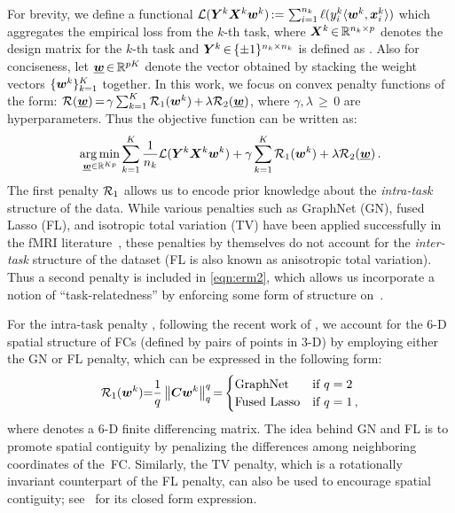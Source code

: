 For brevity, we define a functional $\mathcal{L}({\bm{Y}}^k{\bm{X}}^k{\bm{w}}^k)\,{:=}\,\sum_{i=1}^{n_k}\ell(y_i^k\langle{\ensuremath{\bm{w}}}^k,{\bm{x}}_i^k\rangle)$ which aggregates the empirical loss from the $k$-th task, where ${\bm{X}}^k\,{\in}\,\mathbb{R}^{n_k{\times}p}$ denotes the design matrix for the \mbox{$k$-th} task and ${\bm{Y}}^k\,{\in}\,\{\pm1\}^{n_k{\times}n_k}$ is defined as . 
Also for conciseness, let $\underline{{\bm{w}}}\,{\in}\,\mathbb{R}^{pK}$ denote the vector obtained by stacking the weight vectors $\{{\bm{w}}^k\}_{k=1}^K$ together.
In this work, we focus on convex penalty functions of the form:
$\mathcal{R}(\underline{{\bm{w}}})\,{=}\,\gamma\sum_{k=1}^K \mathcal{R}_1({\bm{w}}^k)\,{+}\,\lambda\mathcal{R}_2(\underline{{\bm{w}}})$, where $\gamma,\lambda\,{\geq}\,0$ are hyperparameters.
Thus the objective function can be written as:
\begin{equation}
	\operatorname*{arg\,min}_{\underline{{\bm{w}}}\in\mathbb{R}^{Kp}}\sum_{k=1}^K
	\frac{1}{n_k}\mathcal{L}({\bm{Y}}^k{\bm{X}}^k{\bm{w}}^k)
		+\gamma\sum_{k=1}^K\mathcal{R}_1({\bm{w}}^k)
		+\lambda\mathcal{R}_2(\underline{{\bm{w}}})\,.
	\label{eqn:erm2}
\end{equation}
The first penalty $\mathcal{R}_1$ allows us to encode prior knowledge about the \emph{intra-task} structure of the data.
While various penalties such as GraphNet (GN), fused Lasso (FL), and isotropic total variation (TV) have been applied successfully in the fMRI literature~\cite{Watanabe:2014, Michel:2011, Baldassarre:2012,Grosenick:2013}, these penalties by themselves do not account for the \emph{inter-task} structure of the dataset (FL is also known as anisotropic total variation).
Thus a second penalty \RegB is included in \eqref{eqn:erm2}, which allows us incorporate a notion of ``task-relatedness'' by enforcing some form of structure on~\wall.

For the intra-task penalty \RegA, following the recent work of \cite{Watanabe:2014}, we account for the \mbox{$6$-D} spatial structure of FCs (defined by pairs of points in $3$-D) by employing either the GN or FL penalty, which can be expressed in the following form: 
\vspace{-2pt}\begin{equation}\vspace{-4pt}
	\RegA(\wk){=}\frac{1}{q}\norm{\C\wk}_q^q{=}
	\begin{cases}
		\text{GraphNet} & \text{if } q=2	\\[0pt]
		\text{Fused Lasso} & \text{if } q=1 \,,
	\end{cases}
	\nonumber
\end{equation}
where \C denotes a $6$-D finite differencing matrix.
The idea behind GN and FL is to promote spatial contiguity by penalizing the differences among neighboring coordinates of the~FC.
Similarly, the TV penalty, which is a rotationally invariant counterpart of the FL penalty, can also be used to encourage spatial contiguity; see~\cite{Michel:2011} for its closed form expression.



